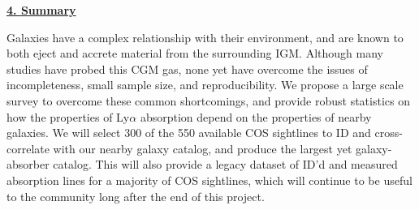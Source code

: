 \documentclass[12pt]{article}
\begin{document}
\noindent \underline{\textbf{4. Summary}}

Galaxies have a complex relationship with their environment, and are known to both eject and accrete material from the surrounding IGM. Although many studies have probed this CGM gas, none yet have overcome the issues of incompleteness, small sample size, and reproducibility. We propose a large scale survey to overcome these common shortcomings, and provide robust statistics on how the properties of Ly$\alpha$ absorption depend on the properties of nearby galaxies. We will select 300 of the 550 available COS sightlines to ID and cross-correlate with our nearby galaxy catalog, and produce the largest yet galaxy-absorber catalog. This will also provide a legacy dataset of ID'd and measured absorption lines for a majority of COS sightlines, which will continue to be useful to the community long after the end of this project.



%



\end{document}
